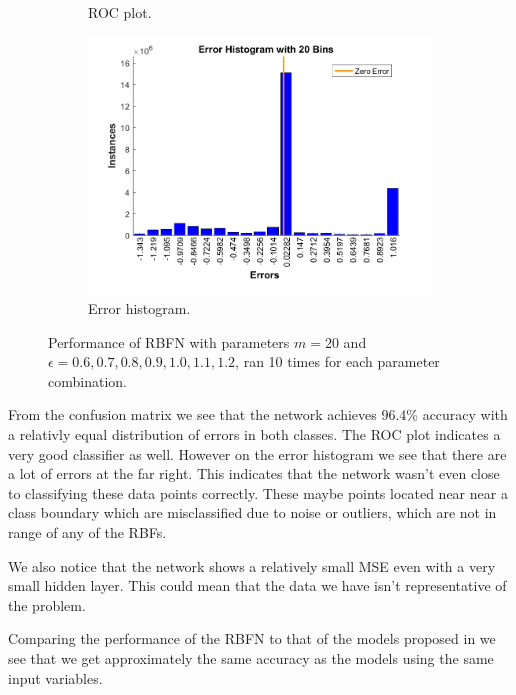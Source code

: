 \documentclass[a4paper, 11pt]{article}
\begin{document}
\begin{figure}[h]
\begin{subfigure}[t]{0.32\textwidth}
        \caption{ROC plot.}
        \label{fig:roc}
    \end{subfigure}
    \hfill %
    \begin{subfigure}[t]{0.32\textwidth}
        \includegraphics[width=\textwidth]{../figures/final/errhist.png}
        \caption{Error histogram.}
        \label{fig:errhist}
    \end{subfigure}
    \caption{Performance of RBFN with parameters $m = 20$ and $\epsilon = 0.6,0.7, 0.8, 0.9, 1.0, 1.1, 1.2$, ran 10  times for each parameter combination.}\label{fig:Accuracy of selected architecture on the test set from a single run.}
\end{figure}

From the confusion matrix we see that the network achieves 96.4\% accuracy with a relativly equal distribution of errors in both classes. The ROC plot indicates a very good classifier as well. However on the error histogram we see that there are a lot of errors at the far right. This indicates that the network wasn't even close to classifying these data points correctly. These maybe points located near near a class boundary which are misclassified due to noise or outliers, which are not in range of any of the RBFs. 

We also notice that the network shows a relatively small MSE even with a very small hidden layer. This could mean that the data we have isn't representative of the problem.

Comparing the performance of the RBFN to that of the models proposed in \cite{Candanedo2016} we see that we get approximately the same accuracy as the models using the same input variables.
\end{document}
